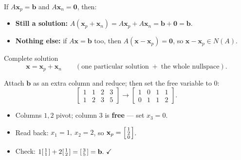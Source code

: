 \documentclass[aspectratio=169, 11pt]{beamer}
\newcommand{\xx}{\mathbf{x}}
\newcommand{\bb}{\mathbf{b}}
\newcommand{\zero}{\mathbf{0}}
\begin{document}
\begin{frame}[t, plain]
  If $A\xx_p=\bb$ and $A\xx_n=\zero$, then:
  \begin{itemize}
    \setlength{\itemsep}{5pt}
    \item \textbf{Still a solution:} $A(\xx_p+\xx_n)=A\xx_p+A\xx_n=\bb+\zero=\bb$.
    \item \textbf{Nothing else:} if $A\xx=\bb$ too, then $A(\xx-\xx_p)=\zero$, so $\xx-\xx_p\in N(A)$.
  \end{itemize}
  \vspace{4pt}
  \begin{block}{Complete solution}
    \[ \xx=\xx_p+\xx_n \qquad(\text{one particular solution} \;+\; \text{the whole nullspace}). \]
  \end{block}
\end{frame}

\begin{frame}[t, plain]
  \burgundyheader{Find $\xx_p$: reduce $[A\mid\bb]$}
  Attach $\bb$ as an extra column and reduce; then set the free variable to $0$:
  \[
    \left[\begin{array}{ccc|c} 1 & 1 & 2 & 3 \\ 1 & 2 & 3 & 5 \end{array}\right]
    \longrightarrow
    \left[\begin{array}{ccc|c} 1 & 0 & 1 & 1 \\ 0 & 1 & 1 & 2 \end{array}\right].
  \]
  \begin{itemize}
    \setlength{\itemsep}{4pt}
    \item Columns $1,2$ pivot; column $3$ is \textbf{free} --- set $x_3=0$.
    \item Read back: $x_1=1,\ x_2=2$, so $\xx_p=\begin{bsmallmatrix} 1\\2\\0 \end{bsmallmatrix}$.
    \item Check: $1\begin{bsmallmatrix} 1\\1 \end{bsmallmatrix}+2\begin{bsmallmatrix} 1\\2 \end{bsmallmatrix}=\begin{bsmallmatrix} 3\\5 \end{bsmallmatrix}=\bb.\ \checkmark$
  \end{itemize}
\end{frame}
\end{document}
